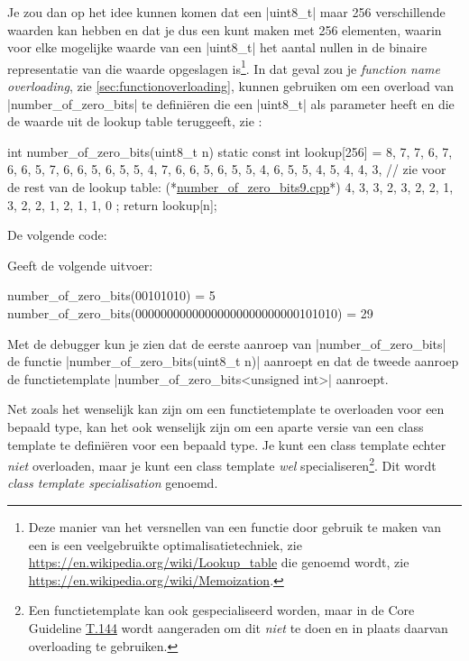 \begin{cpplstShortInline}
Je zou dan op het idee kunnen komen dat een |uint8_t| maar 256 verschillende waarden kan hebben en dat je dus een \emph{} kunt maken met 256 elementen, waarin voor elke mogelijke waarde van een |uint8_t| het aantal nullen in de binaire representatie van die waarde opgeslagen is\footnote{%
	Deze manier van het versnellen van een functie door gebruik te maken van een \emph{} is een veelgebruikte optimalisatietechniek, zie \url{https://en.wikipedia.org/wiki/Lookup_table} die \emph{} genoemd wordt, zie \url{https://en.wikipedia.org/wiki/Memoization}.
}.
In dat geval zou je \emph{function name overloading}, zie \cref{sec:functionoverloading}, kunnen gebruiken om een overload van |number_of_zero_bits| te definiëren die een |uint8_t| als parameter heeft en die de waarde uit de lookup table teruggeeft, zie :
\begin{cpplstfragment}[escapeinside={(*}{*)}]
int number_of_zero_bits(uint8_t n) {
    static const int lookup[256] = {
        8, 7, 7, 6, 7, 6, 6, 5, 7, 6, 6, 5, 6, 5, 5, 4, 
        7, 6, 6, 5, 6, 5, 5, 4, 6, 5, 5, 4, 5, 4, 4, 3, 
		// zie voor de rest van de lookup table: (*\href{\progsurl/number_of_zero_bits9.cpp}{number\_of\_zero\_bits9.cpp}*)
        4, 3, 3, 2, 3, 2, 2, 1, 3, 2, 2, 1, 2, 1, 1, 0
    };
    return lookup[n];
}
\end{cpplstfragment}

De volgende code:

Geeft de volgende uitvoer:
\begin{coutput}
number_of_zero_bits(00101010) = 5
number_of_zero_bits(00000000000000000000000000101010) = 29
\end{coutput}
Met de debugger kun je zien dat de eerste aanroep van |number_of_zero_bits| de functie |number_of_zero_bits(uint8_t n)| aanroept en dat de tweede aanroep de functietemplate |number_of_zero_bits<unsigned int>| aanroept.

Net zoals het wenselijk kan zijn om een functietemplate te overloaden voor een bepaald type, kan het ook wenselijk zijn om een aparte versie van een class template te definiëren voor een bepaald type.
Je kunt een class template echter \emph{niet} overloaden, maar je kunt een class template \emph{wel} specialiseren\footnote{%
	Een functietemplate kan ook gespecialiseerd worden, maar in de \Cpp{} Core Guideline \href{https://isocpp.github.io/CppCoreGuidelines/CppCoreGuidelines\#t144-dont-specialize-function-templates}{T.144} wordt aangeraden om dit \emph{niet} te doen en in plaats daarvan overloading te gebruiken.
}.
Dit wordt \emph{class template specialisation} genoemd.


\end{cpplstShortInline}
